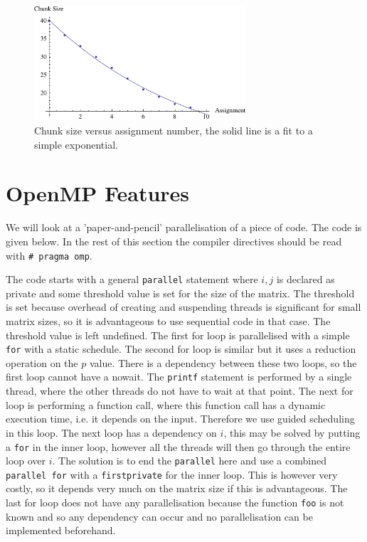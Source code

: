 \documentclass[11pt,a4paper,onecolumn]{article}
\begin{document}
\begin{figure}[H]
  \centering
  \includegraphics[width=0.7\textwidth]{fit.pdf}
  \caption{Chunk size versus assignment number, the solid line is a fit to a simple exponential.}
  \label{fig:fit}
\end{figure}

\section{OpenMP Features}
We will look at a 'paper-and-pencil' parallelisation of a piece of code. The code is given below. In the rest of this section the compiler directives should be read with \texttt{\# pragma omp}.



The code starts with a general \texttt{parallel} statement where $i, j$ is declared as private and some threshold value is set for the size of the matrix. The threshold is set because overhead of creating and suspending threads is significant for small matrix sizes, so it is advantageous to use sequential code in that case. The threshold value is left undefined. The first for loop is parallelised with a simple \texttt{for} with a static schedule. The second for loop is similar but it uses a reduction operation on the $p$ value. There is a dependency between these two loops, so the first loop cannot have a nowait. The \texttt{printf} statement is performed by a single thread, where the other threads do not have to wait at that point. The next for loop is performing a function call, where this function call has a dynamic execution time, i.e. it depends on the input. Therefore we use guided scheduling in this loop. The next loop has a dependency on $i$, this may be solved by putting a \texttt{for} in the inner loop, however all the threads will then go through the entire loop over $i$. The solution is to end the \texttt{parallel} here and use a combined \texttt{parallel for} with a \texttt{firstprivate} for the inner loop. This is however very costly, so it depends very much on the matrix size if this is advantageous. The last for loop does not have any parallelisation because the function \texttt{foo} is not known and so any dependency can occur and no parallelisation can be implemented beforehand.
\end{document}
